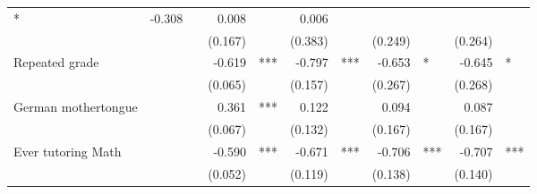 \documentclass{article}
\begin{document}
\begin{table}[!h]
\begin{tabular}{lllllllllll}
  \multicolumn{1}{l}{*} &
  \multicolumn{1}{r}{-0.308} &
  \multicolumn{1}{l}{} &
  \multicolumn{1}{r}{0.008} &
  \multicolumn{1}{l}{} &
  \multicolumn{1}{r}{0.006} &
  \multicolumn{1}{l}{} \\
\multicolumn{1}{l}{} &
  \multicolumn{1}{r}{} &
  \multicolumn{1}{l}{} &
  \multicolumn{1}{r}{(0.167)} &
  \multicolumn{1}{l}{} &
  \multicolumn{1}{r}{(0.383)} &
  \multicolumn{1}{l}{} &
  \multicolumn{1}{r}{(0.249)} &
  \multicolumn{1}{l}{} &
  \multicolumn{1}{r}{(0.264)} &
  \multicolumn{1}{l}{} \\
\multicolumn{1}{l}{Repeated grade} &
  \multicolumn{1}{r}{} &
  \multicolumn{1}{l}{} &
  \multicolumn{1}{r}{-0.619} &
  \multicolumn{1}{l}{***} &
  \multicolumn{1}{r}{-0.797} &
  \multicolumn{1}{l}{***} &
  \multicolumn{1}{r}{-0.653} &
  \multicolumn{1}{l}{*} &
  \multicolumn{1}{r}{-0.645} &
  \multicolumn{1}{l}{*} \\
\multicolumn{1}{l}{} &
  \multicolumn{1}{r}{} &
  \multicolumn{1}{l}{} &
  \multicolumn{1}{r}{(0.065)} &
  \multicolumn{1}{l}{} &
  \multicolumn{1}{r}{(0.157)} &
  \multicolumn{1}{l}{} &
  \multicolumn{1}{r}{(0.267)} &
  \multicolumn{1}{l}{} &
  \multicolumn{1}{r}{(0.268)} &
  \multicolumn{1}{l}{} \\
\multicolumn{1}{l}{German mothertongue} &
  \multicolumn{1}{r}{} &
  \multicolumn{1}{l}{} &
  \multicolumn{1}{r}{0.361} &
  \multicolumn{1}{l}{***} &
  \multicolumn{1}{r}{0.122} &
  \multicolumn{1}{l}{} &
  \multicolumn{1}{r}{0.094} &
  \multicolumn{1}{l}{} &
  \multicolumn{1}{r}{0.087} &
  \multicolumn{1}{l}{} \\
\multicolumn{1}{l}{} &
  \multicolumn{1}{r}{} &
  \multicolumn{1}{l}{} &
  \multicolumn{1}{r}{(0.067)} &
  \multicolumn{1}{l}{} &
  \multicolumn{1}{r}{(0.132)} &
  \multicolumn{1}{l}{} &
  \multicolumn{1}{r}{(0.167)} &
  \multicolumn{1}{l}{} &
  \multicolumn{1}{r}{(0.167)} &
  \multicolumn{1}{l}{} \\
\multicolumn{1}{l}{Ever tutoring Math} &
  \multicolumn{1}{r}{} &
  \multicolumn{1}{l}{} &
  \multicolumn{1}{r}{-0.590} &
  \multicolumn{1}{l}{***} &
  \multicolumn{1}{r}{-0.671} &
  \multicolumn{1}{l}{***} &
  \multicolumn{1}{r}{-0.706} &
  \multicolumn{1}{l}{***} &
  \multicolumn{1}{r}{-0.707} &
  \multicolumn{1}{l}{***} \\
\multicolumn{1}{l}{} &
  \multicolumn{1}{r}{} &
  \multicolumn{1}{l}{} &
  \multicolumn{1}{r}{(0.052)} &
  \multicolumn{1}{l}{} &
  \multicolumn{1}{r}{(0.119)} &
  \multicolumn{1}{l}{} &
  \multicolumn{1}{r}{(0.138)} &
  \multicolumn{1}{l}{} &
  \multicolumn{1}{r}{(0.140)} &

\end{tabular}
\end{table}
\end{document}
